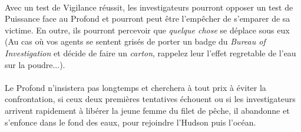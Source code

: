 \paragraph{} Avec un test de Vigilance réussit, les investigateurs pourront opposer un test de Puissance face au Profond et pourront peut être l'empêcher
de s'emparer de sa victime. En outre, ils pourront percevoir que \textit{quelque chose} se déplace sous eux (Au cas où vos agents se sentent
grisés de porter un badge du \textit{Bureau of Investigation} et décide de faire un \textit{carton}, rappelez leur l'effet regretable de l'eau
sur la poudre...).

\paragraph{} Le Profond n'insistera pas longtemps et cherchera à tout prix à éviter la confrontation, si ceux deux premières tentatives échouent ou
si les investigateurs arrivent rapidement à libérer la jeune femme du filet de pêche, il abandonne et s'enfonce dans le fond des eaux, pour rejoindre
l'Hudson puis l'océan.
